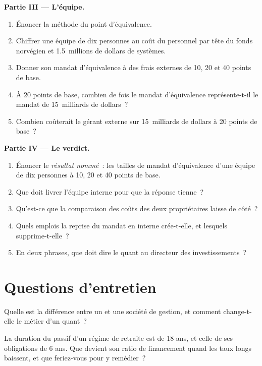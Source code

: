 \begin{problem}
\medskip\noindent\textbf{Partie III --- L'équipe.}
\begin{enumerate}[resume]
\item Énoncer la méthode du point d'équivalence.
\item Chiffrer une équipe de dix personnes au coût du personnel par tête du fonds norvégien et 1.5~millions de dollars de systèmes.
\item Donner son mandat d'équivalence à des frais externes de 10, 20 et 40 points de base.
\item À 20 points de base, combien de fois le mandat d'équivalence représente-t-il le mandat de 15~milliards de dollars~?
\item Combien coûterait le gérant externe sur 15~milliards de dollars à 20 points de base~?
\end{enumerate}

\medskip\noindent\textbf{Partie IV --- Le verdict.}
\begin{enumerate}[resume]
\item Énoncer le \emph{résultat nommé}~: les tailles de mandat d'équivalence d'une équipe de dix personnes à 10, 20 et 40 points de base.
\item Que doit livrer l'équipe interne pour que la réponse tienne~?
\item Qu'est-ce que la comparaison des coûts des deux propriétaires laisse de côté~?
\item Quels emplois la reprise du mandat en interne crée-t-elle, et lesquels supprime-t-elle~?
\item En deux phrases, que doit dire le quant au directeur des investissements~?
\end{enumerate}
\end{problem}

\section{Questions d'entretien}

\begin{interviewq}\label{iq:in:asset-managers-pensions-sovereign-funds-and-insurers:1}
Quelle est la différence entre un  et une société de gestion, et comment change-t-elle le métier d'un quant~?
\end{interviewq}

\begin{interviewq}\label{iq:in:asset-managers-pensions-sovereign-funds-and-insurers:2}
La duration du passif d'un régime de retraite est de 18 ans, et celle de ses obligations de 6 ans. Que devient son
ratio de financement quand les taux longs baissent, et que feriez-vous pour y remédier~?
\end{interviewq}


